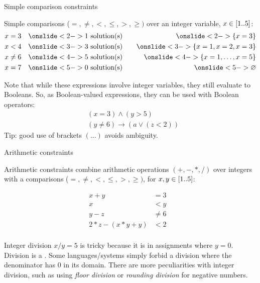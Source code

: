 \documentclass{cons-beamer}
\begin{document}
\begin{frame}{Simple comparison constraints}

	Simple comparisons ($=, \neq, <, \leq, >, \geq)$ over an integer variable, \eg $x \in [1..5]$:
  \begin{align}
	  x &= 3 & \onslide<2->{1}~\text{solution(s)} & \quad & \onslide<2->{\set{x = 3}}\\
	  x & < 4 & \onslide<3->{3}~\text{solution(s)} && \onslide<3->{\set{x = 1, x = 2, x = 3}}\\
	  x &\neq 6 & \onslide<4->{5}~\text{solution(s)} && \onslide<4->{\set{x = 1, \ldots, x = 5}}\\
	  x & = 7 & \onslide<5->{0}~\text{solution(s)} && \onslide<5->{\EmptySet} \\
  \end{align}

  Note that while these expressions involve integer variables, they still evaluate to Booleans. So, as Boolean-valued expressions, they can be used with Boolean operators:
  \begin{align}
      &(x = 3) \wedge (y > 5) \\
      &(y \neq 6) \rightarrow (a \vee (z < 2))
  \end{align}
	Tip: good use of brackets $(\ldots)$ avoids ambiguity.
\end{frame}



\begin{frame}{Arithmetic constraints}

	Arithmetic constraints combine arithmetic operations $(+,-,*,/)$ over integers with a comparisons ($=, \neq, <, \leq, >, \geq)$, \eg for $x, y \in [1..5]$:

  \begin{align}
	  x + y &= 3\\
	  x &< y & \\
    y - z &\neq 6 \\
    2*z - (x*y + y) & < 2 \\
  \end{align}

  \pause
  \parBreak

	Integer division $x/y = 5$ is tricky because it is  in assignments where $y=0$.
Division is a .
	Some languages/systems simply forbid a division where the denominator has $0$ in its domain. There are more peculiarities with integer division, such as using \textit{floor division} or \textit{rounding division} for negative numbers.
\end{frame}
\end{document}
